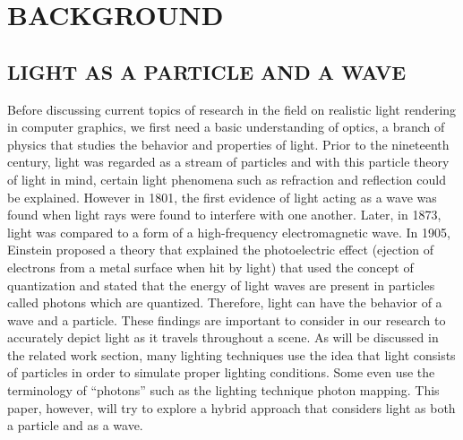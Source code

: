 \chapter{BACKGROUND}

\section{LIGHT AS A PARTICLE AND A WAVE}
Before discussing current topics of research in the field on realistic light rendering in computer graphics, we first need a basic understanding of optics, a branch of physics that studies the behavior and properties of light.  Prior to the nineteenth century, light was regarded as a stream of particles and with this particle theory of light in mind, certain light phenomena such as refraction and reflection could be explained.  However in 1801, the first evidence of light acting as a wave was found when light rays were found to interfere with one another.  Later, in 1873, light was compared to a form of a high-frequency electromagnetic wave.  In 1905, Einstein proposed a theory that explained the photoelectric effect (ejection of electrons from a metal surface when hit by light) that used the concept of quantization and stated that the energy of light waves are present in particles called photons which are quantized.  \cite{Serway2004}  Therefore, light can have the behavior of a wave and a particle.  These findings are important to consider in our research to accurately depict light as it travels throughout a scene.  As will be discussed in the related work section, many lighting techniques use the idea that light consists of particles in order to simulate proper lighting conditions.  Some even use the terminology of “photons” such as the lighting technique photon mapping.  This paper, however, will try to explore a hybrid approach that considers light as both a particle and as a wave.

